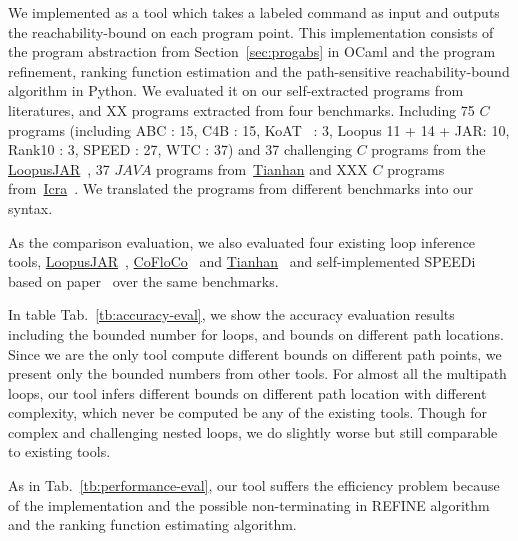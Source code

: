 We implemented {\THESYSTEM} as a tool which takes a labeled command as input  
and outputs the reachability-bound on each program point.
This implementation consists of the 
program abstraction from Section~\ref{sec:progabs} in OCaml and the program refinement, ranking function estimation and the path-sensitive reachability-bound algorithm in Python.
We evaluated it on our self-extracted programs from literatures, and XX programs extracted from four benchmarks. 
Including 75 $C$ programs (including ABC : 15, C4B : 15, KoAT~\cite{BrockschmidtEFFG14,FalkeKS12,FalkeKS11} : 3, Loopus 11 + 14 + JAR: 10, Rank10 : 3, SPEED : 27, WTC : 37) and 37 challenging $C$ programs 
from the \hyperlink{https://forsyte.at/static/people/sinn/loopusJAR/index.html}{LoopusJAR}~\cite{SinnZV17},
37 $JAVA$ programs from~\hyperlink{https://zenodo.org/record/5140586\#.Y5pBoC-B1QI}{Tianhan}\cite{LuCT21}
and XXX $C$ programs from~\hyperlink{https://github.com/icra-team/icra}{Icra}~\cite{KincaidBCR19,CyphertBKR19}.
We translated the programs from different benchmarks into our syntax.

As the comparison evaluation, we also evaluated four existing loop inference tools, 
\hyperlink{https://forsyte.at/software/loopus/}{LoopusJAR}~\cite{SinnZV17},
\hyperlink{https://github.com/aeflores/CoFloCo/tree/master/src}{CoFloCo}~\cite{Montoya17,Flores-Montoya16,Flores-MontoyaH14}
and \hyperlink{https://zenodo.org/record/5140586\#.Y5pBoC-B1QI}{Tianhan}~\cite{LuCT21}
and self-implemented SPEEDi based on paper~\cite{GulwaniJK09}
over the same benchmarks.

In table Tab.~\ref{tb:accuracy-eval}, we show the accuracy evaluation results including the bounded number for loops, and bounds on different path locations.
Since we are the only tool compute different bounds on different path points, we present only the bounded numbers from other tools. For almost all the multipath loops, our tool infers different bounds on different path location with different complexity, which never be computed be any of the existing tools.
Though for complex and challenging nested loops, we do slightly worse but still comparable to existing tools.

As in Tab.~\ref{tb:performance-eval}, our tool suffers the efficiency problem because of the implementation and the possible non-terminating in REFINE algorithm and the ranking function estimating algorithm.


